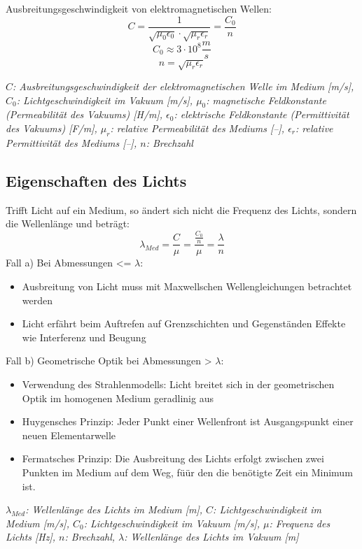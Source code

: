 \documentclass[a4paper,10pt]{article}
\newenvironment{displayformula}
{
	\begin{framed}
		\color{formulaColor}
	}
	{\end{framed}}
\newcommand{\formulalegend}[1]{%
	\par\vspace{0.5ex}%
	{{\color{legendColor}\RaggedRight\small\textit{#1}}}%
	\par\vspace{1.5ex}%
}
\begin{document}
\begin{displayformula}
	Ausbreitungsgeschwindigkeit von elektromagnetischen Wellen:
	\[
	C = \frac{1}{\sqrt{\mu_0 \epsilon_0} \cdot \sqrt{\mu_r \epsilon_r}} = \frac{C_0}{n}
	\]
	\[
	C_0 \approx 3 \cdot 10^8 \frac{m}{s}
	\]
	\[
	n = \sqrt{\mu_r \epsilon_r}
	\]
\end{displayformula}
\formulalegend{
	\( C \): Ausbreitungsgeschwindigkeit der elektromagnetischen Welle im Medium [m/s], 
	\( C_0 \): Lichtgeschwindigkeit im Vakuum [m/s], 
	\( \mu_0 \): magnetische Feldkonstante (Permeabilität des Vakuums) [H/m], 
	\( \epsilon_0 \): elektrische Feldkonstante (Permittivität des Vakuums) [F/m], 
	\( \mu_r \): relative Permeabilität des Mediums [–], 
	\( \epsilon_r \): relative Permittivität des Mediums [–], 
	\( n \): Brechzahl
}


\subsection{Eigenschaften des Lichts}

\begin{displayformula}
	Trifft Licht auf ein Medium, so ändert sich nicht die Frequenz des Lichts, sondern die Wellenlänge und beträgt:
	\[
	\lambda_{Med} = \frac{C}{\mu} = \frac{\frac{C_0}{n}}{\mu} = \frac{\lambda}{n}
	\]
	Fall a) Bei Abmessungen <= $\lambda$: \\
	\begin{itemize}
		\item Ausbreitung von Licht muss mit Maxwellschen Wellengleichungen betrachtet werden 
		\item Licht erfährt beim Auftrefen auf Grenzschichten und Gegenständen Effekte wie Interferenz und Beugung \\
	\end{itemize}
	
	Fall b) Geometrische Optik bei Abmessungen > $\lambda$: \\
	\begin{itemize}
		\item Verwendung des Strahlenmodells: Licht breitet sich in der geometrischen Optik im homogenen Medium geradlinig aus 
		\item Huygensches Prinzip: Jeder Punkt einer Wellenfront ist Ausgangspunkt einer neuen Elementarwelle
		\item Fermatsches Prinzip: Die Ausbreitung des Lichts erfolgt zwischen zwei Punkten im Medium auf dem Weg, füür den die benötigte Zeit ein Minimum ist.
	\end{itemize}

\end{displayformula}
\formulalegend{
	\( \lambda_{Med} \): Wellenlänge des Lichts im Medium [m], 
	\( C \): Lichtgeschwindigkeit im Medium [m/s], 
	\( C_0 \): Lichtgeschwindigkeit im Vakuum [m/s], 
	\( \mu \): Frequenz des Lichts [Hz], 
	\( n \): Brechzahl, 
	\( \lambda \): Wellenlänge des Lichts im Vakuum [m]
}
\end{document}
